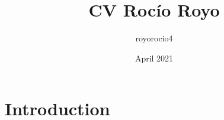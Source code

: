 \documentclass{article}
\title{CV Rocío Royo}
\author{royorocio4 }
\date{April 2021}
\begin{document}
\maketitle

\section{Introduction}
\end{document}
